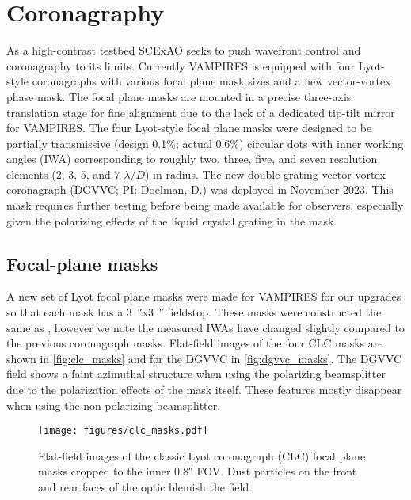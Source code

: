 \section{Coronagraphy}\label{sec:coronagraphy}

As a high-contrast testbed SCExAO seeks to push wavefront control and coronagraphy to its limits. Currently VAMPIRES is equipped with four Lyot-style coronagraphs with various focal plane mask sizes and a new vector-vortex phase mask. The focal plane masks are mounted in a precise three-axis translation stage for fine alignment due to the lack of a dedicated tip-tilt mirror for VAMPIRES. The four Lyot-style focal plane masks were designed to be partially transmissive (design 0.1\%; actual 0.6\%) circular dots with inner working angles (IWA) corresponding to roughly two, three, five, and seven resolution elements (2, 3, 5, and 7 $\lambda/D$) in radius. The new double-grating vector vortex coronagraph (DGVVC; PI: Doelman, D.) was deployed in November 2023. This mask requires further testing before being made available for observers, especially given the polarizing effects of the liquid crystal grating in the mask.

\subsection{Focal-plane masks}

A new set of Lyot focal plane masks were made for VAMPIRES for our upgrades so that each mask has a \SI{3}{\arcsecond}x\SI{3}{\arcsecond} fieldstop. These masks were constructed the same as \citet{lucas_visible-light_2022}, however we note the measured IWAs have changed slightly compared to the previous coronagraph masks. Flat-field images of the four CLC masks are shown in \autoref{fig:clc_masks} and for the DGVVC in \autoref{fig:dgvvc_masks}. The DGVVC field shows a faint azimuthal structure when using the polarizing beamsplitter due to the polarization effects of the mask itself. These features mostly disappear when using the non-polarizing beamsplitter.

\begin{figure}
    \centering
    \texttt{[image: figures/clc\_masks.pdf]}
    \caption{Flat-field images of the classic Lyot coronagraph (CLC) focal plane masks cropped to the inner \ang{;;0.8} FOV. Dust particles on the front and rear faces of the optic blemish the field.\label{fig:clc_masks}}
\end{figure}

